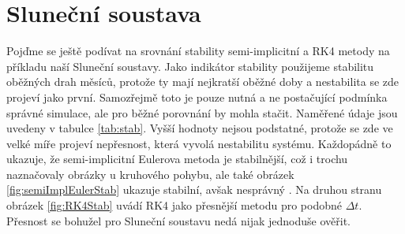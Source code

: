 \section{Sluneční soustava}
Pojďme se ještě podívat na srovnání stability semi-implicitní a RK4 metody na příkladu naší Sluneční soustavy. Jako indikátor stability použijeme stabilitu oběžných drah měsíců, protože ty mají nejkratší oběžné doby a nestabilita se zde projeví jako první. Samozřejmě toto je pouze nutná a ne postačující podmínka správné simulace, ale pro běžné porovnání by mohla stačit. Naměřené údaje jsou uvedeny v tabulce \ref{tab:stab}. Vyšší hodnoty nejsou podstatné, protože se zde ve velké míře projeví nepřesnost, která vyvolá nestabilitu systému. Každopádně to ukazuje, že semi-implicitní Eulerova metoda je stabilnější, což i trochu naznačovaly obrázky u kruhového pohybu, ale také obrázek \ref{fig:semiImplEulerStab} ukazuje stabilní, avšak nesprávný . Na druhou stranu obrázek \ref{fig:RK4Stab} uvádí RK4 jako přesnější metodu pro podobné $ \Delta t $. Přesnost se bohužel pro Sluneční soustavu nedá nijak jednoduše ověřit. 


